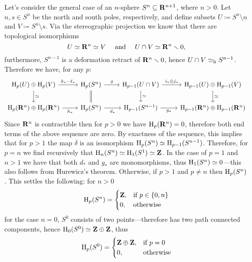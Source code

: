\begin{example}[\(n\)-spheres]
    \label{exp:homology-of-sphere}
    Let's consider the general case of an \(n\)-sphere \(S^n \subseteq \mathbf{R}^{n+1}\), where
    \(n > 0\). Let \(n, s \in S^n\) be the north and south poles, respectively, and
    define subsets \(U \coloneq S^n \setminus n\) and
    \(V \coloneq S^n \setminus s\). Via the stereographic projection we know that there are
    topological isomorphisms
    \[
        U \simeq \mathbf{R}^n \simeq V \quad \text{ and } \quad U \cap V \simeq \mathbf{R}^n \smallsetminus 0,
    \]
    furthermore, \(S^{n-1}\) is a deformation retract of \(\mathbf{R}^n \smallsetminus 0\), hence
    \(U \cap V \simeq_{\text{h}} S^{n-1}\). Therefore we have, for any \(p\):
    \[
        \begin{tikzcd}
            \Hmlg_p(U) \oplus \Hmlg_p(V) \ar[r, "k_{*} - \ell_{*}"]
            \ar[d, "\dis"]
            &\Hmlg_p(S^n) \ar[r, "\delta"]
            \ar[d, equals]
            &\Hmlg_{p-1}(U \cap V) \ar[r, "i_{*} \oplus j_{*}"]
            \ar[d, "\dis"]
            &\Hmlg_{p-1}(U) \oplus \Hmlg_{p-1}(V)
            \ar[d, "\dis"]
            \\
            \Hmlg_p(\R^n) \oplus \Hmlg_p(\R^n) \ar[r, "h_{*}"']
            &\Hmlg_p(S^n) \ar[r, "d_{*}"']
            &\Hmlg_{p-1}(S^{n-1}) \ar[r, "g_{*}"']
            &\Hmlg_{p-1}(\R^n) \oplus \Hmlg_{p-1}(\R^n)
        \end{tikzcd}
    \]
    Since \(\mathbf{R}^n\) is contractible then for \(p > 0\) we have \(\operatorname{H}_p(\mathbf{R}^n) = 0\),
    therefore both end terms of the above sequence are zero. By exactness of the
    sequence, this implies that for \(p > 1\) the map \(\delta\) is an isomorphism
    \(\operatorname{H}_p(S^n) \simeq \operatorname{H}_{p-1}(S^{n-1})\). Therefore, for \(p = n\) we find
    recursively that \(\operatorname{H}_n(S^n) \simeq \operatorname{H}_1(S^1) \simeq \mathbf{Z}\). In the case of
    \(p = 1\) and \(n > 1\) we have that both \(d_{*}\) and \(g_{*}\) are
    monomorphisms, thus \(\operatorname{H}_1(S^n) \simeq 0\)---this also follows from Hurewicz's
    theorem. Otherwise, if \(p > 1\) and \(p \neq n\) then \(\operatorname{H}_p(S^n)\). This
    settles the following: for \(n > 0\)
    \[
        \operatorname{H}_p(S^n) =
        \begin{cases}
            \mathbf{Z}, & \text{if } p \in \{0, n\} \\
            0,  & \text{otherwise}
        \end{cases}
    \]
    for the case \(n = 0\), \(S^0\) consists of two points---therefore has two path
    connected components, hence \(\operatorname{H}_0(S^0) \simeq \mathbf{Z} \oplus \mathbf{Z}\), thus
    \[
        \operatorname{H}_p(S^0) =
        \begin{cases}
            \mathbf{Z} \oplus \mathbf{Z}, & \text{if } p = 0 \\
            0,            & \text{otherwise}
        \end{cases}
    \]
\end{example}

